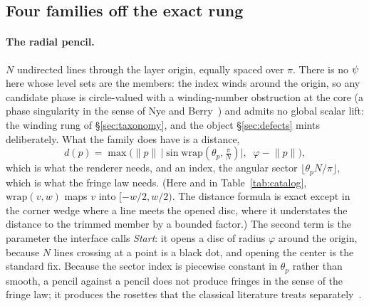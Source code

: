 \subsection{Four families off the exact rung}
\label{sec:offrung}

\paragraph{The radial pencil.} $N$ undirected lines through the layer origin,
equally spaced over $\pi$. There is no $\psi$ here whose level sets are the members:
the index winds around the origin, so any candidate phase is circle-valued with
a winding-number obstruction at the core (a phase singularity in the sense of
Nye and Berry~\cite{Nye1974Dislocations}) and admits no global scalar lift:
the winding rung of \S\ref{sec:taxonomy}, and the object \S\ref{sec:defects}
mints deliberately.
What the family does have is a distance,
\begin{equation}
  d(p)=\max\!\Big(\lVert p\rVert\,\big\lvert\sin\mathrm{wrap}(\theta_p,\tfrac{\pi}{N})\big\rvert,
  \;\; \varphi-\lVert p\rVert\Big),
  \label{eq:radial}
\end{equation}
which is what the renderer needs, and an index, the angular sector
$\lfloor \theta_p N/\pi\rfloor$, which is what the fringe law needs. (Here
and in Table~\ref{tab:catalog}, $\mathrm{wrap}(v,w)$ maps $v$ into
$[-w/2,w/2)$. The distance formula is exact except in the corner wedge where
a line meets the opened disc, where it understates the distance to the
trimmed member by a bounded factor.) The second
term is the parameter the interface calls \emph{Start}: it opens a disc of radius
$\varphi$ around the origin, because $N$ lines crossing at a point is a black dot,
and opening the center is the standard fix. Because the sector index is piecewise
constant in $\theta_p$ rather than smooth, a pencil against a pencil does not
produce fringes in the sense of the fringe law; it produces the rosettes
that the classical literature treats separately~\cite{Amidror2009Theory}.

